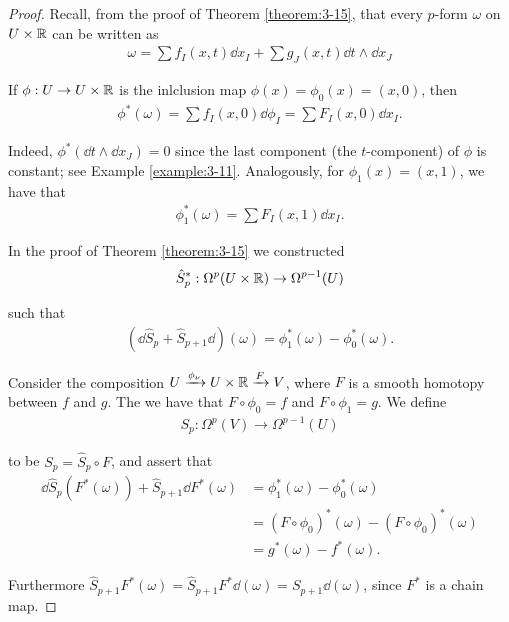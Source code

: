 \begin{proof}
Recall, from the proof of Theorem \ref{theorem:3-15}, that every $p$-form $\omega$ on $U\times\mathbb{R}$
can be written as
\begin{align*}
  \omega = \sum f_I(x, t)\dd x_I + \sum g_J(x, t)\dd t\wedge\dd x_J
\end{align*}

If $\phi:U\to U\times\mathbb{R}$ is the inlclusion map $\phi(x) = \phi_0(x) = (x, 0)$, then 
\begin{align*}
  \phi^*(\omega) = \sum f_I(x, 0)\dd \phi_I = \sum F_I(x, 0)\dd x_I.
\end{align*}

Indeed, $\phi^*(\dd t\wedge\dd x_J) = 0$ since the last component (the $t$-component) of $\phi$ is
constant; see Example \ref{example:3-11}. Analogously, for $\phi_1(x) = (x, 1)$, we have that
\begin{align*}
  \phi^*_1(\omega) = \sum F_I(x, 1)\dd x_I.
\end{align*}

In the proof of Theorem \ref{theorem:3-15} we constructed
\begin{align*}
  \hat{S}^*_p: \Omega^p(U\times\mathbb{R})\to \Omega^{p-1}(U)
\end{align*}

such that 
\begin{align}
  (\dd\hat{S}_p + \hat{S}_{p+1}\dd)(\omega) = \phi^*_1(\omega) - \phi^*_0(\omega).
\end{align}

Consider the composition $U\xrightarrow[]{\phi_\nu}U\times\mathbb{R}\xrightarrow[]{F} V$, where $F$ is a smooth homotopy between 
$f$ and $g$. The we have that $F\circ\phi_0 = f$ and $F\circ\phi_1 = g$. We define 
\begin{align*}
  S_p:\Omega^p(V)\to \Omega^{p-1}(U)
\end{align*}

to be $S_p = \hat{S}_p\circ F$, and assert that 
\begin{align*}
  \dd\hat{S}_p(F^*(\omega)) + \hat{S}_{p+1}\dd F^*(\omega)
  & = \phi_1^*(\omega) - \phi_0^*(\omega) \\
  & = (F\circ\phi_0)^*(\omega) - (F\circ\phi_0)^*(\omega) \\
  & = g^*(\omega) - f^*(\omega).
\end{align*}

Furthermore $\hat{S}_{p+1}F^*(\omega) = \hat{S}_{p+1}F^*\dd(\omega) = S_{p+1}\dd(\omega)$, since 
$F^*$ is a chain map.
\end{proof}


